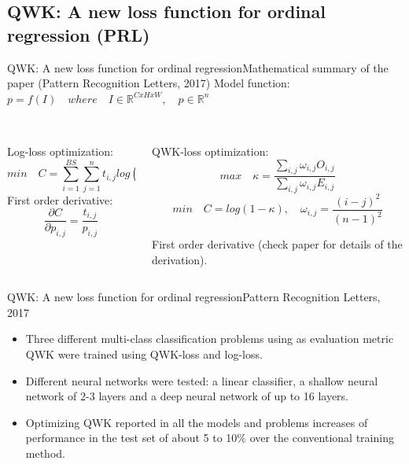 \documentclass{beamer}
\begin{document}
\subsection{QWK: A new loss function for ordinal regression (PRL)}


\begin{frame}{QWK: A new loss function for ordinal regression}{Mathematical summary of the paper (Pattern Recognition Letters, 2017)}	
	Model function: $p = f(I) \quad where \quad I \in \mathbb{R}^{CxHxW}, \quad p \in \mathbb{R}^n$
	\begin{columns}
		\begin{column}{0.5\textwidth}
			\\
			\alert{Log-loss optimization:}
			\begin{equation*}
				min \quad C = \sum_{i=1}^{BS} \sum_{j=1}^{n} t_{i,j} log(p_{i,j})
			\end{equation*}			
			First order derivative:\\
			\begin{equation*}
				\frac{\partial C}{\partial p_{i,j}} = \frac{t_{i,j}}{p_{i,j}}
			\end{equation*}							
		\end{column}
		\begin{column}{0.5\textwidth}  %
			\\
			\alert{QWK-loss optimization:}\\
			\begin{equation*}
			max \quad \kappa = \frac{\sum_{i,j} \omega_{i,j}O_{i,j}}{\sum_{i,j} \omega_{i,j} E_{i,j}} 
			\end{equation*}		
			\begin{equation*}
			min \quad C = log(1 - \kappa), \quad \omega_{i,j} = \frac{(i-j)^2}{(n-1)^2}
			\end{equation*}		
				
			First order derivative (check paper for details of the derivation).			
		\end{column}
	\end{columns}	
\end{frame}

\begin{frame}{QWK: A new loss function for ordinal regression}{Pattern Recognition Letters, 2017}	
	\begin{itemize}
		\item  Three different multi-class classification problems using as evaluation metric QWK were trained using QWK-loss and log-loss.
		\item Different neural networks were tested: a linear classifier, a shallow neural network of 2-3 layers and a deep neural network of up to 16 layers.
		\item Optimizing QWK reported in all the models and problems increases of performance in the test set of about 5 to 10\% over the conventional training method.
\end{itemize}	
\end{frame}
\end{document}
